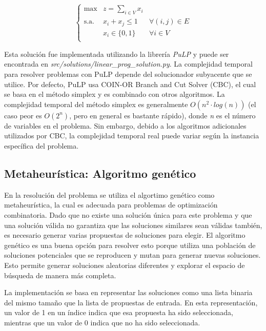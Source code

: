 \documentclass[10pt]{article} %
\begin{document}
	\begin{equation} \left\{
		\begin{matrix}
			\max & \displaystyle z=\sum_{i \in V}x_{i}\\
			\textrm{s.a.} & x_i + x_j \leq 1 & \forall (i, j) \in E \\
			& x_i \in \{0, 1\} & \forall i \in V \\ 
		\end{matrix} \right. 
	\end{equation} 
	
	Esta soluci\'on fue implementada utilizando la librer\'ia \textit{PuLP} y puede ser encontrada en \textit{src/solutions/linear\_prog\_solution.py}. La complejidad temporal para resolver problemas con PuLP depende del solucionador subyacente que se utilice. Por defecto, PuLP usa COIN-OR Branch and Cut Solver (CBC), el cual se basa en el método simplex y es combinado con otros algoritmos. La complejidad temporal del método simplex es generalmente  $O(n^2 \cdot log(n))$ (el caso peor es $O(2^{n})$, pero en general es bastante r\'apido), donde \textit{n} es el número de variables en el problema. Sin embargo, debido a los algoritmos adicionales utilizados por CBC, la complejidad temporal real puede variar según la instancia específica del problema.
	
	
	\subsection{Metaheur\'istica: Algoritmo gen\'etico}
	
	En la resoluci\'on del problema se utiliza el algortimo gen\'etico como metaheur\'istica, la cual es adecuada para problemas de optimización combinatoria. 	Dado que no existe una solución única para este problema y que una solución válida no garantiza que las soluciones similares sean válidas también, es necesario generar varias propuestas de soluciones para elegir. El algoritmo genético es una buena opción para resolver esto porque utiliza una población de soluciones potenciales que se reproducen y mutan para generar nuevas soluciones. Esto permite generar soluciones aleatorias diferentes y explorar el espacio de b\'usqueda de manera más completa.
	
	La implementación se basa en representar las soluciones como una lista binaria del mismo tamaño que la lista de propuestas de entrada. En esta representación, un valor de 1 en un índice indica que esa propuesta ha sido seleccionada, mientras que un valor de 0 indica que no ha sido seleccionada.
	
\end{document}
